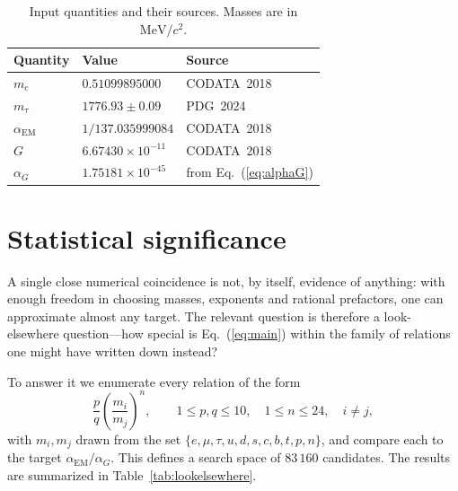 \documentclass[aps,prd,twocolumn,amsmath,amssymb,floatfix,nofootinbib]{revtex4-2}
\begin{document}
\begin{table}[t]
\caption{Input quantities and their sources. Masses are in
$\mathrm{MeV}/c^2$.}
\label{tab:inputs}
\begin{ruledtabular}
\begin{tabular}{lll}
Quantity & Value & Source \\
\hline
$m_e$ & $0.51099895000$ & CODATA~2018~\cite{codata2018} \\
$m_\tau$ & $1776.93\pm 0.09$ & PDG~2024~\cite{pdg2024} \\
$\alpha_{\mathrm{EM}}$ & $1/137.035999084$ & CODATA~2018~\cite{codata2018} \\
$G$ & $6.67430\times 10^{-11}$ & CODATA~2018~\cite{codata2018} \\
$\alpha_G$ & $1.75181\times 10^{-45}$ & from Eq.~(\ref{eq:alphaG}) \\
\end{tabular}
\end{ruledtabular}
\end{table}

\section{Statistical significance}
\label{sec:lookelsewhere}

A single close numerical coincidence is not, by itself, evidence of anything:
with enough freedom in choosing masses, exponents and rational prefactors, one
can approximate almost any target. The relevant question is therefore a
look-elsewhere question---how special is Eq.~(\ref{eq:main}) within the family
of relations one might have written down instead?

To answer it we enumerate every relation of the form
\begin{equation}
\frac{p}{q}\left(\frac{m_i}{m_j}\right)^{\!n},
\qquad
1\le p,q \le 10,\quad
1\le n \le 24,\quad
i\neq j,
\label{eq:family}
\end{equation}
with $m_i,m_j$ drawn from the set
$\{e,\mu,\tau,u,d,s,c,b,t,p,n\}$, and compare each to the target
$\alpha_{\mathrm{EM}}/\alpha_G$. This defines a search space of $83\,160$
candidates. The results are summarized in Table~\ref{tab:lookelsewhere}.
\end{document}
